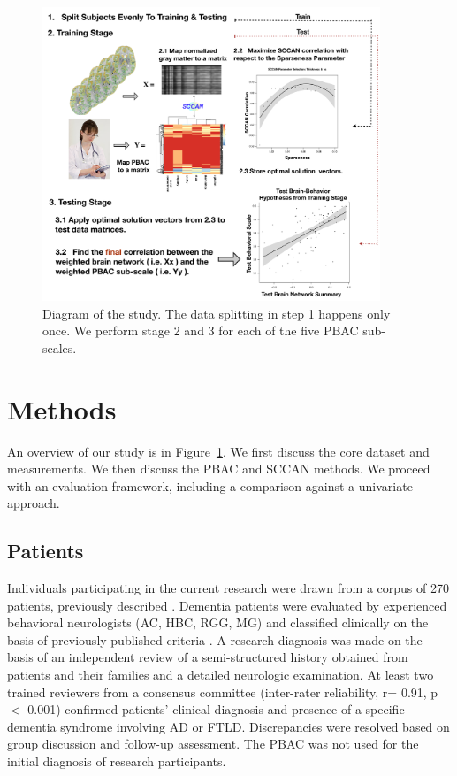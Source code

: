 \documentclass[preprint,authoryear,12pt]{elsarticle}
\begin{document}
\begin{figure}[th] \centering
\includegraphics[width=0.9\textwidth]{./figs/sccan_study.pdf}
\caption{Diagram of the study.  The data splitting in step 1 happens only once.  We perform stage 2 and 3 for each of the five PBAC sub-scales.}
\label{fig:study}
\end{figure}

\section{Methods} An overview of our study is in Figure~\ref{fig:study}.  We first discuss the core dataset and measurements.  We then discuss the PBAC and SCCAN methods.  We proceed with an evaluation framework, including a comparison against a univariate approach.
\subsection{Patients}  Individuals participating in the current research were drawn from a corpus of 270 patients, previously described \citet{libon_philadelphia_2011}.  Dementia patients were evaluated by experienced behavioral neurologists (AC, HBC, RGG, MG) and classified clinically on the basis of previously published criteria \citet{McKhann01,Rascovsky2011,Gorno-Tempini20111006}.  A research diagnosis was made on the basis of an independent review of a semi-structured history obtained from patients and their families and a detailed neurologic examination.  At least two trained reviewers from a consensus committee (inter-rater reliability, r= 0.91, p $<$ 0.001) confirmed patients' clinical diagnosis and presence of a specific dementia syndrome involving AD or FTLD. Discrepancies were resolved based on group discussion and follow-up assessment.  The PBAC was not used for the initial diagnosis of research participants.  
\end{document}
